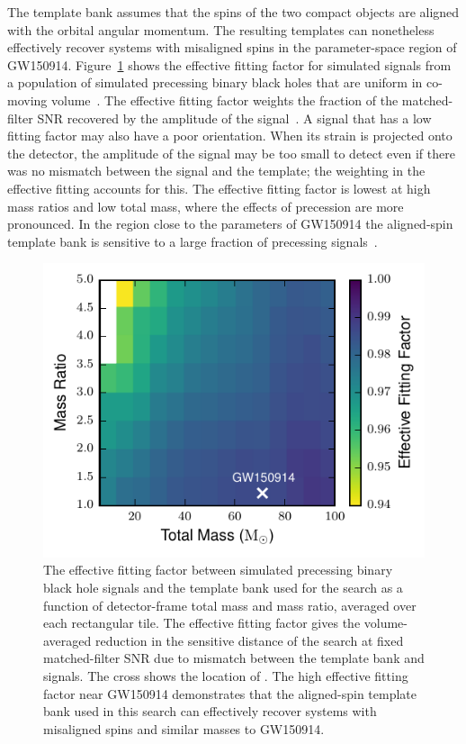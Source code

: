 The template bank assumes that the spins of the two compact objects are
aligned with the orbital angular momentum. The resulting templates can
nonetheless effectively recover systems with misaligned spins in the
parameter-space region of GW150914. Figure~\ref{fig:precessing_effective_ff}
shows the effective fitting factor for simulated signals from a population of
simulated precessing binary black holes that are uniform in co-moving
volume~\cite{Pan:2013rra,HarryetalInPrep}. The effective fitting factor
weights the fraction of the matched-filter SNR recovered by the amplitude of
the signal~\cite{BuonannoChenVallisneri:2003b}. A signal that has a low
fitting factor may also have a poor orientation. When its strain is projected
onto the detector, the amplitude of the signal may be too small to detect even
if there was no mismatch between the signal and the template; the weighting in
the effective fitting accounts for this.  The effective fitting factor is
lowest at high mass ratios and low total mass, where the effects of precession
are more pronounced. In the region close to the parameters of GW150914  the
aligned-spin template bank is sensitive to a large fraction of precessing
signals~\cite{HarryetalInPrep}.
\begin{figure}[t]
\includegraphics[width=\textwidth]{figs/chapter2/eff_ff_prec.pdf}
\caption{\label{fig:precessing_effective_ff}
The effective fitting factor between simulated precessing binary black hole
signals and the template bank used for the search as a function of
detector-frame total mass and mass ratio, averaged over each rectangular tile.
The effective fitting factor gives the volume-averaged reduction in the
sensitive distance of the search at fixed matched-filter SNR due to mismatch
between the template bank and signals.  The cross shows the location of
\TheEvent{}. The high effective fitting factor near GW150914 demonstrates that
the aligned-spin template bank used in this search can effectively recover
systems with misaligned spins and similar masses to GW150914.}
\end{figure}

